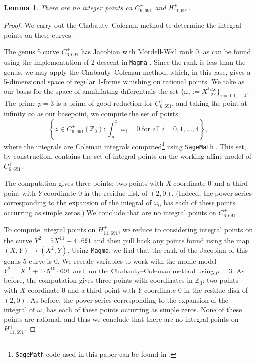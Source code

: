 \documentclass[12pt]{amsart}
\newtheorem{lem}{Lemma}[section]
\newcommand{\Z}{\mathbb{Z}}
\numberwithin{equation}{section}
\begin{document}
\begin{lem}\label{Plus691}
There are no integer points on $C^{+}_{6,691}$ and $H^{+}_{11,691}.$
\end{lem}
\begin{proof}
We carry out the Chabauty--Coleman method \cite{coleman} to determine the integral points on these curves. 

The genus 5 curve $C^{+}_{6,691}$ has Jacobian with Mordell-Weil rank 0, as can be found using the implementation of 2-descent in \texttt{Magma} \cite{magma}. Since the rank is less than the genus, we may apply the Chabauty--Coleman method, which, in this case, gives a 5-dimensional space of regular 1-forms vanishing on rational points. We take as our basis for the space of annihilating differentials the set $\{\omega_i := X^i \frac{dX}{2Y}\}_{i = 0, 1, \ldots, 4}.$ The prime $p = 3$ is a prime of good reduction for $C^{+}_{6,691}$, and taking the point at infinity $\infty$ as our basepoint, we compute the set of points $$\left\{z \in C^{+}_{6,691}(\Z_3): \int_{\infty}^z \omega_i = 0\;\textrm{for all}\;{i = 0, 1, \ldots, 4}\right\},$$ where the integrals are Coleman integrals computed\footnote{\texttt{SageMath} code used in this paper can be found in \cite{github}.} using \texttt{SageMath} \cite{sage}. This set, by construction, contains the set of integral points on the working affine model of $C^{+}_{6,691}$. 

The computation gives three points: two points with $X$-coordinate 0 and a third point with $Y$-coordinate 0 in the residue disk of $(2,0)$. (Indeed, the power series corresponding to the expansion of the integral of $\omega_0$ has each of these points occurring as simple zeros.)  We conclude that are no integral points on $C^{+}_{6,691}$.

To compute integral points on $H^{+}_{11,691}$, we reduce to considering integral points on the curve $Y^2 = 5X^{11} + 4 \cdot 691$ and then pull back any points found using the map $(X,Y) \rightarrow (X^2,Y)$. Using \texttt{Magma}, we find that the rank of the Jacobian of this genus 5 curve is 0. We rescale variables to work with the monic model $Y^2 = X^{11}+4\cdot 5^{10}\cdot 691$ and run the Chabauty--Coleman method using $p = 3$. As before, the computation gives three points with coordinates in $\Z_3$: two points with $X$-coordinate 0 and a third point with $Y$-coordinate 0 in the residue disk of $(2,0)$. As before, the power series corresponding to the expansion of the integral of $\omega_0$ has each of these points occurring as simple zeros.  None of these points are rational, and thus we conclude that there are no integral points on $H^{+}_{11,691}$.
\end{proof}
\end{document}
